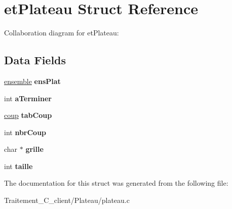 \hypertarget{structet_plateau}{}\section{et\+Plateau Struct Reference}
\label{structet_plateau}


Collaboration diagram for et\+Plateau\+:
\subsection*{Data Fields}
\begin{DoxyCompactItemize}
\item 
\hyperlink{groupe_8h_a56928d429399ca3112579f4f3093898a}{ensemble} {\bfseries ens\+Plat}\hypertarget{structet_plateau_a1318aeb369239b199baa78aa5f647fce}{}\label{structet_plateau_a1318aeb369239b199baa78aa5f647fce}

\item 
int {\bfseries a\+Terminer}\hypertarget{structet_plateau_afc67d9fd17baff4c27c8c2e1c23580be}{}\label{structet_plateau_afc67d9fd17baff4c27c8c2e1c23580be}

\item 
\hyperlink{plateau_8h_a7613767b26f7cf7d36e3e013d65e519c}{coup} {\bfseries tab\+Coup}\hypertarget{structet_plateau_af59f332ec4bcc5f65982f621e1f7e141}{}\label{structet_plateau_af59f332ec4bcc5f65982f621e1f7e141}

\item 
int {\bfseries nbr\+Coup}\hypertarget{structet_plateau_a9b6e1ab1ce360bc32b16f5f43b8a1c5c}{}\label{structet_plateau_a9b6e1ab1ce360bc32b16f5f43b8a1c5c}

\item 
char $\ast$ {\bfseries grille}\hypertarget{structet_plateau_a8131c572ce92cb32ba5cf4979634adca}{}\label{structet_plateau_a8131c572ce92cb32ba5cf4979634adca}

\item 
int {\bfseries taille}\hypertarget{structet_plateau_a29bf3fc0ffe4e72e45f0c84ab4f8cd1e}{}\label{structet_plateau_a29bf3fc0ffe4e72e45f0c84ab4f8cd1e}

\end{DoxyCompactItemize}


The documentation for this struct was generated from the following file\+:\begin{DoxyCompactItemize}
\item 
Traitement\+\_\+\+C\+\_\+client/\+Plateau/plateau.\+c\end{DoxyCompactItemize}
